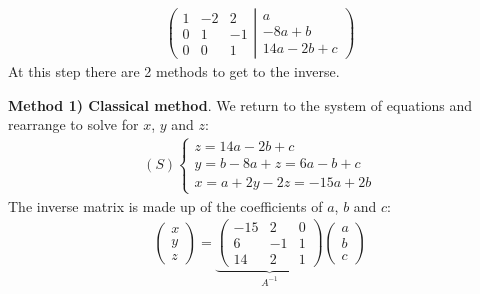 \documentclass[usenames,dvipsnames,aspectratio=169,10pt]{beamer}
\numberwithin{equation}{section}
\begin{document}
\begin{frame}
\vspace{-0.6cm}
\begin{align*}
\left(
	\begin{matrix}
   1 &  -2 &  2 \\
   0 &   1 & -1 \\
   0 &   0 &  1
	\end{matrix}
  \left|
	\begin{matrix}
		a \\
		-8a + b \\
		14a -2b + c
	\end{matrix}
  \right.
\right)
\end{align*}
At this step there are 2 methods to get to the inverse.

\textbf{Method 1) Classical method}. We return to the system of equations and rearrange to solve for $x$, $y$ and $z$:
\vspace{-0.3cm}
\begin{align*}
(S) 
\begin{cases}
z = 14a -2b + c\\
y = b - 8a + z = 6a - b + c\\
x = a + 2y - 2z = -15a + 2b
\end{cases}
\end{align*}
The inverse matrix is made up of the coefficients of $a$, $b$ and $c$:
\begin{align*}
\begin{pmatrix}
x \\
y \\
z
\end{pmatrix}
=
\underbrace{
\begin{pmatrix}
 -15 &  2 & 0 \\
   6 & -1 & 1 \\
  14 &  2 & 1
\end{pmatrix}}_{A^{-1}}
\begin{pmatrix}
a \\
b \\
c
\end{pmatrix}
\end{align*}
\end{frame}
\end{document}
